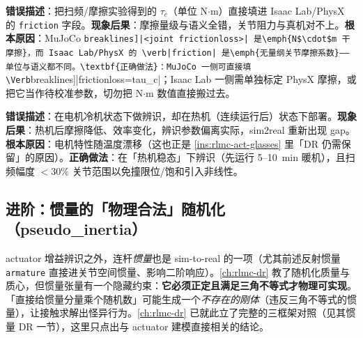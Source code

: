 \begin{pitfall}
\textbf{错误描述}：把扫频/摩擦实验得到的 $\tau_c$（单位 N$\cdot$m）直接填进 Isaac Lab/PhysX 的 \verb|friction| 字段。\textbf{现象后果}：摩擦量级与语义全错，关节阻力与真机对不上。\textbf{根本原因}：MuJoCo \Verb[breaklines]|<joint frictionloss>| 是\emph{N$\cdot$m 干摩擦}，而 Isaac Lab/PhysX 的 \verb|friction| 是\emph{无量纲关节摩擦系数}——单位与语义都不同。\textbf{正确做法}：MuJoCo 一侧可直接填 \Verb[breaklines]|frictionloss=tau_c|；Isaac Lab 一侧需单独标定 PhysX 摩擦，或把它当作待校准参数，切勿把 N$\cdot$m 数值直接搬过去。
\end{pitfall}

\begin{pitfall}
\textbf{错误描述}：在电机冷机状态下做辨识，却在热机（连续运行后）状态下部署。\textbf{现象后果}：热机后摩擦降低、效率变化，辨识参数偏离实际，sim2real 重新出现 gap。\textbf{根本原因}：电机特性随温度漂移（这也正是 \cref{ins:rlmc-act-glasses} 里「DR 仍需保留」的原因）。\textbf{正确做法}：在「热机稳态」下辨识（先运行 5--10~min 暖机），且扫频幅度 $<30\%$ 关节范围以免撞限位/饱和引入非线性。
\end{pitfall}

\subsection{进阶：惯量的「物理合法」随机化（pseudo\_inertia）}
\label{sec:rlmc-act-inertia-dr}

actuator 增益辨识之外，连杆\emph{惯量}也是 sim-to-real 的一项（尤其前述反射惯量 \verb|armature| 直接进关节空间惯量、影响二阶响应）。\cref{ch:rlmc-dr} 教了随机化质量与质心，但惯量张量有一个隐藏约束：\textbf{它必须正定且满足三角不等式才物理可实现}。「直接给惯量分量乘个随机数」可能生成一个\emph{不存在的刚体}（违反三角不等式的惯量），让接触求解出怪异行为。\cref{ch:rlmc-dr} 已就此立了完整的三框架对照（见其惯量 DR 一节），这里只点出与 actuator 建模直接相关的结论。


